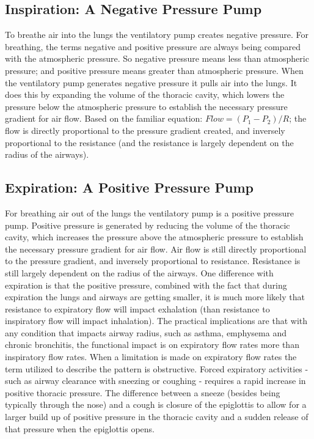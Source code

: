 \subsection{Inspiration: A Negative Pressure Pump} 
To breathe air into the lungs the ventilatory pump creates negative pressure. For breathing, the terms negative and positive pressure are always being compared with the atmospheric pressure. So negative pressure means less than atmospheric pressure; and positive pressure means greater than atmospheric pressure. When the ventilatory pump generates negative pressure it pulls air into the lungs. It does this by expanding the volume of the thoracic cavity, which lowers the pressure below the atmospheric pressure to establish the necessary pressure gradient for air flow. Based on the familiar equation: $Flow = (P_1 - P_2) / R$; the flow is directly proportional to the pressure gradient created, and inversely proportional to the resistance (and the resistance is largely dependent on the radius of the airways). 

\subsection{Expiration: A Positive Pressure Pump} For breathing air out of the lungs the ventilatory pump is a positive pressure pump. Positive pressure is generated by reducing the volume of the thoracic cavity, which increases the pressure above the atmospheric pressure to establish the necessary pressure gradient for air flow. Air flow is still directly proportional to the pressure gradient, and inversely proportional to resistance. Resistance is still largely dependent on the radius of the airways. 
One difference with expiration is that the positive pressure, combined with the fact that during expiration the lungs and airways are getting smaller, it is much more likely that resistance to expiratory flow will impact exhalation (than resistance to inspiratory flow will impact inhalation). The practical implications are that with any condition that impacts airway radius, such as asthma, emphysema and chronic bronchitis, the functional impact is on expiratory flow rates more than inspiratory flow rates. When a limitation is made on expiratory flow rates the term utilized to describe the pattern is obstructive. 
Forced expiratory activities - such as airway clearance with sneezing or coughing - requires a rapid increase in positive thoracic pressure. The difference between a sneeze (besides being typically through the nose) and a cough is closure of the epiglottis to allow for a larger build up of positive pressure in the thoracic cavity and a sudden release of that pressure when the epiglottis opens.  

